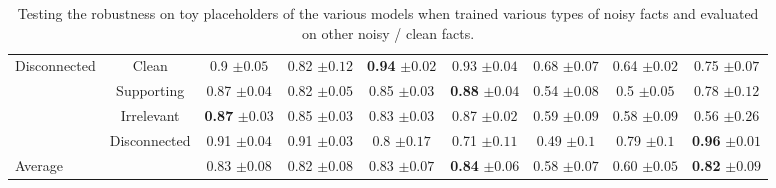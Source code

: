 \begin{table*}[t!]
{\begin{tabular}{@{}cccccccc|c@{}}
\multirow{3}{*}{Disconnected} & \multicolumn{1}{c|}{Clean} & 0.9 \tiny $\pm 0.05$ & 0.82 \tiny $\pm 0.12$ & \textbf{0.94} \tiny $\pm 0.02$ & 0.93 \tiny $\pm 0.04$ & 0.68 \tiny $\pm 0.07$ & 0.64 \tiny $\pm 0.02$ & 0.75 \tiny $\pm 0.07$ \\
 & \multicolumn{1}{c|}{Supporting} & 0.87 \tiny $\pm 0.04$ & 0.82 \tiny $\pm 0.05$ & 0.85 \tiny $\pm 0.03$ & \textbf{0.88} \tiny $\pm 0.04$ & 0.54 \tiny $\pm 0.08$ & 0.5 \tiny $\pm 0.05$ & 0.78 \tiny $\pm 0.12$ \\
 & \multicolumn{1}{c|}{Irrelevant} & \textbf{0.87} \tiny $\pm 0.03$ & 0.85 \tiny $\pm 0.03$ & 0.83 \tiny $\pm 0.03$ & 0.87 \tiny $\pm 0.02$ & 0.59 \tiny $\pm 0.09$ & 0.58 \tiny $\pm 0.09$ & 0.56 \tiny $\pm 0.26$ \\
\multicolumn{1}{l}{} & \multicolumn{1}{c|}{Disconnected} & 0.91 \tiny $\pm 0.04$ & 0.91 \tiny $\pm 0.03$ & 0.8 \tiny $\pm 0.17$ & 0.71 \tiny $\pm 0.11$ & 0.49 \tiny $\pm 0.1$ & 0.79 \tiny $\pm 0.1$ & \textbf{0.96} \tiny $\pm 0.01$ \\ \midrule
\multicolumn{1}{l}{Average} & \multicolumn{1}{c|}{} & 0.83 \tiny $\pm 0.08$ & 0.82 \tiny $\pm 0.08$ & 0.83 \tiny $\pm 0.07$ & \textbf{0.84} \tiny $\pm 0.06$ & 0.58 \tiny $\pm 0.07$ & 0.60 \tiny $\pm 0.05$ & \textbf{0.82} \tiny $\pm 0.09$ \\ \bottomrule
\end{tabular}}
\caption{Testing the robustness on toy placeholders of the various models when trained various types of noisy facts and evaluated on other noisy / clean facts.}
\label{tab:robust_toy_appen}
\end{table*}

